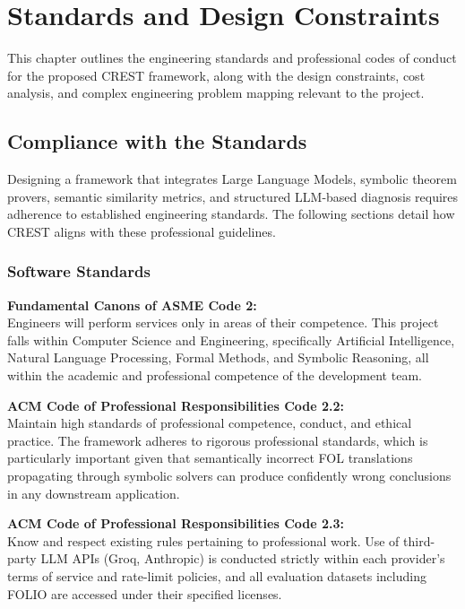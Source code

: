 \chapter{Standards and Design Constraints}

This chapter outlines the engineering standards and professional codes of conduct for the proposed CREST framework, along with the design constraints, cost analysis, and complex engineering problem mapping relevant to the project.

\section{Compliance with the Standards}

Designing a framework that integrates Large Language Models, symbolic theorem provers, semantic similarity metrics, and structured LLM-based diagnosis requires adherence to established engineering standards. The following sections detail how CREST aligns with these professional guidelines.

\subsection{Software Standards}

\textbf{Fundamental Canons of ASME Code 2:}\\
Engineers will perform services only in areas of their competence. This project falls within Computer Science and Engineering, specifically Artificial Intelligence, Natural Language Processing, Formal Methods, and Symbolic Reasoning, all within the academic and professional competence of the development team.

\textbf{ACM Code of Professional Responsibilities Code 2.2:}\\
Maintain high standards of professional competence, conduct, and ethical practice. The framework adheres to rigorous professional standards, which is particularly important given that semantically incorrect FOL translations propagating through symbolic solvers can produce confidently wrong conclusions in any downstream application.

\textbf{ACM Code of Professional Responsibilities Code 2.3:}\\
Know and respect existing rules pertaining to professional work. Use of third-party LLM APIs (Groq, Anthropic) is conducted strictly within each provider's terms of service and rate-limit policies, and all evaluation datasets including FOLIO are accessed under their specified licenses.

